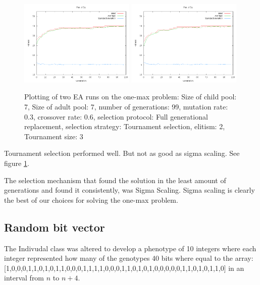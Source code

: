 \documentclass[11pt]{article}
\begin{document}
\begin{figure}[ht]
\begin{center}
\mbox{\includegraphics[width=0.49\textwidth]{images/tou1.png}}
\mbox{\includegraphics[width=0.49\textwidth]{images/tou2.png}}
\end{center}
\caption{Plotting of two EA runs on the one-max problem:
Size of child pool: 7,
Size of adult pool: 7,
number of generations: 99,
mutation rate: 0.3,
crossover rate: 0.6,
selection protocol: Full generational replacement,
selection strategy: Tournament selection,
elitism: 2,
Tournament size: 3}
\label{fig:9}
\end{figure}

Tournament selection performed well. But not as good as sigma scaling. See figure \ref{fig:9}.

The selection mechanism that found the solution in the least amount of generations
and found it consistently, was Sigma Scaling. Sigma scaling is clearly the best of our choices for
solving the one-max problem.

\subsection*{Random bit vector} %

The Indivudal class was altered to develop a phenotype of 10 integers where each integer
represented how many of the genotypes 40 bits where equal to the array:
[1,0,0,0,1,1,0,1,0,1,1,0,0,0,1,1,1,1,0,0,0,1,1,0,1,0,1,0,0,0,0,0,1,1,0,1,0,1,1,0]
in an interval from $n$ to $n+4$.
\end{document}
